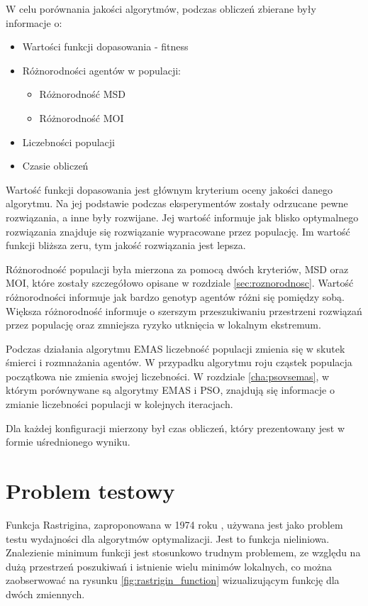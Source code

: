 W celu porównania jakości algorytmów, podczas obliczeń zbierane były informacje o:
\begin{itemize}
\item Wartości funkcji dopasowania - fitness
\item Różnorodności agentów w populacji:
\begin{itemize}
\item Różnorodność MSD
\item Różnorodność MOI
\end{itemize}
\item Liczebności populacji
\item Czasie obliczeń
\end{itemize}

Wartość funkcji dopasowania jest głównym kryterium oceny jakości danego algorytmu. Na jej podstawie podczas eksperymentów zostały odrzucane pewne rozwiązania, a inne były rozwijane. Jej wartość informuje jak blisko optymalnego rozwiązania znajduje się rozwiązanie wypracowane przez populację. Im wartość funkcji bliższa zeru, tym jakość rozwiązania jest lepsza.

Różnorodność populacji była mierzona za pomocą dwóch kryteriów, MSD oraz MOI, które zostały szczegółowo opisane w rozdziale \ref{sec:roznorodnosc}. Wartość różnorodności informuje jak bardzo genotyp agentów różni się pomiędzy sobą. Większa różnorodność informuje o szerszym przeszukiwaniu przestrzeni rozwiązań przez populację oraz zmniejsza ryzyko utknięcia w lokalnym ekstremum.

Podczas działania algorytmu EMAS liczebność populacji zmienia się w skutek śmierci i rozmnażania agentów. W przypadku algorytmu roju cząstek populacja początkowa nie zmienia swojej liczebności. W rozdziale \ref{cha:psovsemas}, w którym porównywane są algorytmy EMAS i PSO, znajdują się informacje o zmianie liczebności populacji w kolejnych iteracjach.

Dla każdej konfiguracji mierzony był czas obliczeń, który prezentowany jest w formie uśrednionego wyniku.


\section{Problem testowy}
\label{sec:rastrigin}

Funkcja Rastrigina, zaproponowana w 1974 roku \cite{rastrigin}, używana jest jako problem testu wydajności dla algorytmów optymalizacji. Jest to funkcja nieliniowa. Znalezienie minimum funkcji jest stosunkowo trudnym problemem, ze względu na dużą przestrzeń poszukiwań i istnienie wielu minimów lokalnych, co można zaobserwować na rysunku \ref{fig:rastrigin_function} wizualizującym funkcję dla dwóch zmiennych.

